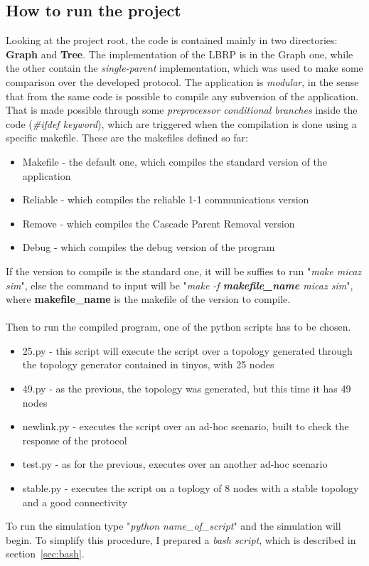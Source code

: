 \documentclass{article}
\begin{document}
	\subsection{How to run the project}
		\label{sec:howto}
Looking at the project root, the code is contained mainly in two directories: \textbf{Graph} and \textbf{Tree}. The implementation of the LBRP is in the Graph one, while the other contain the \textit{single-parent} implementation, which was used to make some comparison over the developed protocol. The application is \textit{modular}, in the sense that from the same code is possible to compile any subversion of the application. That is made possible through some \emph{preprocessor conditional branches} inside the code (\textit{\#ifdef keyword}), which are triggered when the compilation is done using a specific makefile. These are the makefiles defined so far:
		\begin{itemize}
		  \item Makefile - the default one, which compiles the standard version of the application
		  \item Reliable - which compiles the reliable 1-1 communications version
		  \item Remove - which compiles the Cascade Parent Removal version
		  \item Debug - which compiles the debug version of the program
		\end{itemize}

If the version to compile is the standard one, it will be suffies to run "\textit{make micaz sim}", else the command to input will be "\textit{make -f \textbf{makefile\_name} micaz sim}", where \textbf{makefile\_name} is the makefile of the version to compile.\\
\\Then to run the compiled program, one of the python scripts has to be chosen. 
		\begin{itemize}
		  \item 25.py - this script will execute the script over a topology generated through the topology generator contained in tinyos, with 25 nodes
		  \item 49.py - as the previous, the topology was generated, but this time it has 49 nodes
		  \item newlink.py - executes the script over an ad-hoc scenario, built to check the response of the protocol
		  \item test.py - as for the previous, executes over an another ad-hoc scenario
		  \item stable.py - executes the script on a toplogy of 8 nodes with a stable topology and a good connectivity
		\end{itemize}
To run the simulation type "\textit{python name\_of\_script}" and the simulation will begin.
To simplify this procedure, I prepared a \emph{bash script}, which is described in section~\ref{sec:bash}.
\clearpage
\end{document}
